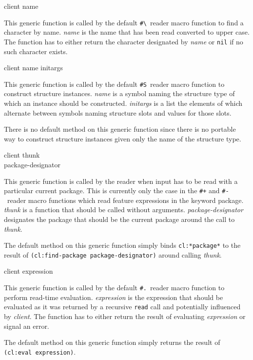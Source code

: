 {client name}

This generic function is called by the default
\texttt{\#\textbackslash}~reader macro function to find a character by
name.  \textit{name} is the name that has been read converted to upper
case.  The function has to either return the character designated by
\textit{name} or \texttt{nil} if no such character exists.

 {client name initargs}

This generic function is called by the default \texttt{\#S}~reader
macro function to construct structure instances.  \textit{name} is a
symbol naming the structure type of which an instance should be
constructed.  \textit{initargs} is a list the elements of which
alternate between symbols naming structure slots and values for those
slots.

There is no default method on this generic function since there is no
portable way to construct structure instances given only the name of
the structure type.

 {client thunk \\
  package-designator}

This generic function is called by the reader when input has to be
read with a particular current package.  This is currently only the
case in the \texttt{\#+} and \texttt{\#-}~reader macro functions which
read feature expressions in the keyword package.  \textit{thunk} is a
function that should be called without arguments.
\textit{package-designator} designates the package that should be the
current package around the call to \textit{thunk}.

The default method on this generic function simply binds
\texttt{cl:*package*} to the result of \texttt{(cl:find-package
  package-designator)} around calling \textit{thunk}.

 {client expression}

This generic function is called by the default \texttt{\#.}~reader
macro function to perform read-time evaluation.  \textit{expression}
is the expression that should be evaluated as it was returned by a
recursive \texttt{read} call and potentially influenced by
\textit{client}.  The function has to either return the result of
evaluating \textit{expression} or signal an error.

The default method on this generic function simply returns the result
of \texttt{(cl:eval expression)}.

